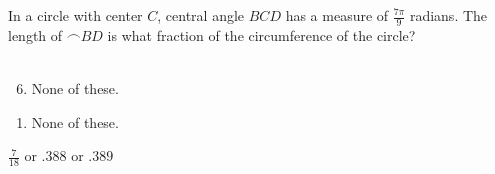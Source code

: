  
In a circle with center $C$, central angle $BCD$ has a measure of $\frac{7\pi}{9}$ radians.  The length of $\frown{BD}$ is what fraction of the circumference of the circle?\\\\


\ifsat
	\begin{enumerate}[label=\Alph*)]
	\end{enumerate}
\else
\fi

\ifacteven
	\begin{enumerate}[label=\textbf{\Alph*.},itemsep=\fill,align=left]
		\setcounter{enumii}{5}
		\item None of these. 
	\end{enumerate}
\else
\fi

\ifactodd
	\begin{enumerate}[label=\textbf{\Alph*.},itemsep=\fill,align=left]
		\item None of these. 
	\end{enumerate}
\else
\fi

\ifgridin
$\frac{7}{18}$ or $.388$ or $.389$
\else
\fi

